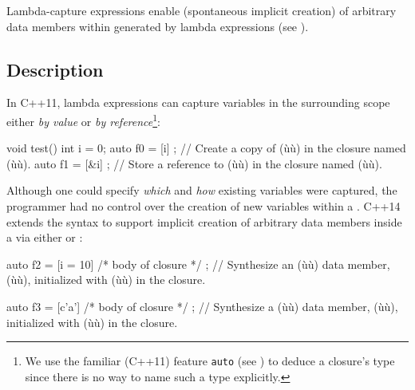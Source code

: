 


\setcounter{table}{0}
\setcounter{footnote}{0}
\setcounter{lstlisting}{0}

Lambda-capture expressions enable  (spontaneous implicit creation) of
arbitrary data members within  generated by
lambda expressions (see ).

\subsection[Description]{Description}\label{description}

In C++11, lambda expressions can capture variables in the
surrounding scope either \emph{by value} or \emph{by reference}{\cprotect\footnote{We use the familiar (C++11) feature
  \lstinline!auto! (see ) to deduce a closure's type since there is no
  way to name such a type explicitly.}}:

\begin{emcppslisting}
void test()
{
    int i = 0;
    auto f0 = [i]{ };   // Create a copy of (ù{}ù) in the closure named (ù{}ù).
    auto f1 = [&i]{ };  // Store a reference to (ù{}ù) in the closure named (ù{}ù).
}
\end{emcppslisting}
    
\noindent Although one could specify \emph{which} and \emph{how} existing
variables were captured, the programmer had no control over the creation
of new variables within a . C++14 extends the
 syntax to support implicit creation of
arbitrary data members inside a  via either  or :

\begin{emcppslisting}[emcppsstandards={c++14}]
auto f2 = [i = 10]{ /* body of closure */ };
    // Synthesize an (ù{}ù) data member, (ù{}ù), initialized with (ù{}ù) in the closure.

auto f3 = [c{'a'}]{ /* body of closure */ };
    // Synthesize a (ù{}ù) data member, (ù{}ù), initialized with (ù{}ù) in the closure.
\end{emcppslisting}
    
